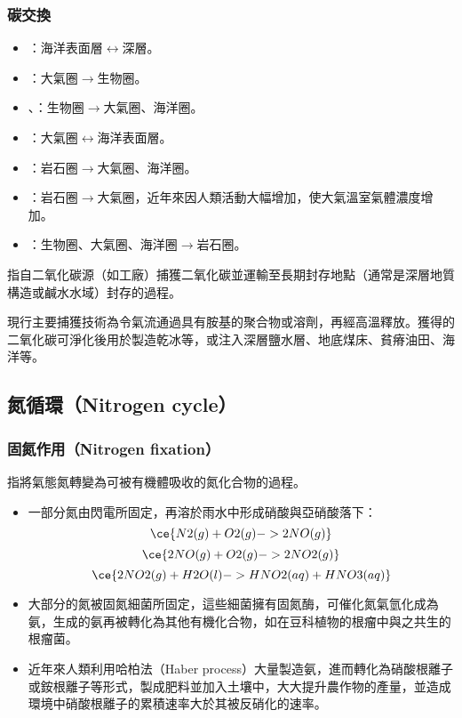 \documentclass[a4paper,12pt]{report}
\begin{document}
\begin{itemize}
\subsubsection{碳交換}
\begin{itemize}
\item {}：海洋表面層$\leftrightarrow$深層。
\item {}：大氣圈$\rightarrow$生物圈。
\item {}、：生物圈$\rightarrow$大氣圈、海洋圈。
\item {}：大氣圈$\leftrightarrow$海洋表面層。
\item {}：岩石圈$\rightarrow$大氣圈、海洋圈。
\item {}：岩石圈$\rightarrow$大氣圈，近年來因人類活動大幅增加，使大氣溫室氣體濃度增加。
\item {}：生物圈、大氣圈、海洋圈$\rightarrow$岩石圈。
\end{itemize}
指自二氧化碳源（如工廠）捕獲二氧化碳並運輸至長期封存地點（通常是深層地質構造或鹹水水域）封存的過程。

現行主要捕獲技術為令氣流通過具有胺基的聚合物或溶劑，再經高溫釋放。獲得的二氧化碳可淨化後用於製造乾冰等，或注入深層鹽水層、地底煤床、貧瘠油田、海洋等。
\subsection{氮循環（Nitrogen cycle）}
\subsubsection{固氮作用（Nitrogen fixation）}
指將氣態氮轉變為可被有機體吸收的氮化合物的過程。
\begin{itemize}
\item 一部分氮由閃電所固定，再溶於雨水中形成硝酸與亞硝酸落下：
\[\ce{N2(g) + O2(g) -> 2NO(g)}\]
\[\ce{2NO(g) + O2(g) -> 2NO2(g)}\]
\[\ce{2NO2(g) + H2O(l) -> HNO2(aq) + HNO3(aq)}\]
\item 大部分的氮被固氮細菌所固定，這些細菌擁有固氮酶，可催化氮氣氫化成為氨，生成的氨再被轉化為其他有機化合物，如在豆科植物的根瘤中與之共生的根瘤菌。
\item 近年來人類利用哈柏法（Haber process）大量製造氨，進而轉化為硝酸根離子或銨根離子等形式，製成肥料並加入土壤中，大大提升農作物的產量，並造成環境中硝酸根離子的累積速率大於其被反硝化的速率。
\end{itemize}

\end{itemize}
\end{document}
